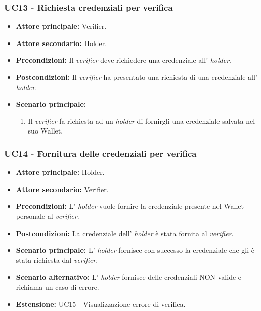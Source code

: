 \subsubsection{UC13 - Richiesta credenziali per verifica}
\begin{itemize}
\item \textbf{Attore principale:} Verifier.
\item \textbf{Attore secondario:} Holder.
\item \textbf{Precondizioni:} Il \textit{verifier} deve richiedere una credenziale all' \textit{holder}.
\item \textbf{Postcondizioni:} Il \textit{verifier} ha presentato una richiesta di una credenziale all' \textit{holder}.
\item \textbf{Scenario principale:} 
    \begin{enumerate}
        \item Il \textit{verifier} fa richiesta ad un \textit{holder} di fornirgli una credenziale salvata nel suo Wallet.
    \end{enumerate}
\end{itemize}

\subsubsection{UC14 - Fornitura delle credenziali per verifica}
\begin{itemize}
\item \textbf{Attore principale:} Holder. 
\item \textbf{Attore secondario:} Verifier.
\item \textbf{Precondizioni:} L’ \textit{holder} vuole fornire la credenziale presente nel Wallet personale al \textit{verifier}.
\item \textbf{Postcondizioni:} La credenziale dell’ \textit{holder} è stata fornita al \textit{verifier}.
\item \textbf{Scenario principale:} L' \textit{holder} fornisce con successo la credenziale che gli è stata richiesta dal \textit{verifier}.
\item \textbf{Scenario alternativo:} L' \textit{holder} fornisce delle credenziali NON valide e richiama un caso di errore.
\item \textbf{Estensione:} UC15 - Visualizzazione errore di verifica.
\end{itemize}


